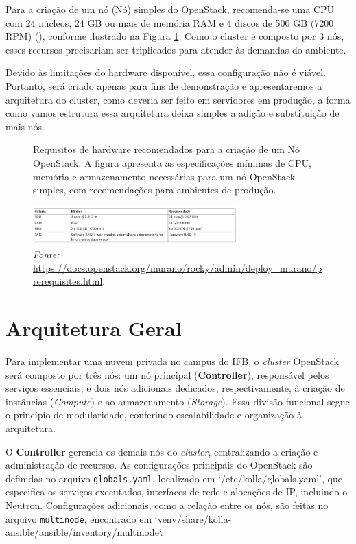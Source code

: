 Para a criação de um nó (Nó) simples do OpenStack, recomenda-se uma CPU com 24 núcleos, 24 GB ou mais de memória RAM e 4 discos de 500 GB (7200 RPM) (\cite{DocumentacaoOpenstack}), conforme ilustrado na Figura \ref{fig:hardware_requirements}. Como o cluster é composto por 3 nós, esses recursos precisariam ser triplicados para atender às demandas do ambiente.

Devido às limitações do hardware disponível, essa configuração não é viável. Portanto, será criado apenas para fins de demonstração e apresentaremos a arquitetura do cluster, como deveria ser feito em servidores em produção, a forma como vamos estrutura essa arquitetura deixa simples a adição e substituição de mais nós.

\begin{figure}[htbp]
    \centering
    \caption{Requisitos de hardware recomendados para a criação de um Nó OpenStack. A figura apresenta as especificações mínimas de CPU, memória e armazenamento necessárias para um nó OpenStack simples, com recomendações para ambientes de produção.}
    \includegraphics[width=0.7\textwidth]{images/hardware_requirements.png}
    \caption*{\textit{Fonte:} \url{https://docs.openstack.org/murano/rocky/admin/deploy_murano/prerequisites.html}.}
    \label{fig:hardware_requirements}
\end{figure}


\section{Arquitetura Geral}

Para implementar uma nuvem privada no campus do IFB, o \textit{cluster} OpenStack será composto por três nós: um nó principal (\textbf{Controller}), responsável pelos serviços essenciais, e dois nós adicionais dedicados, respectivamente, à criação de instâncias (\textit{Compute}) e ao armazenamento (\textit{Storage}). Essa divisão funcional segue o princípio de modularidade, conferindo escalabilidade e organização à arquitetura.

O \textbf{Controller} gerencia os demais nós do \textit{cluster}, centralizando a criação e administração de recursos. As configurações principais do OpenStack são definidas no arquivo \texttt{globals.yaml}, localizado em `/etc/kolla/globals.yaml', que especifica os serviços executados, interfaces de rede e alocações de IP, incluindo o Neutron. Configurações adicionais, como a relação entre os nós, são feitas no arquivo \texttt{multinode}, encontrado em `venv/share/kolla-ansible/ansible/inventory/multinode`.


